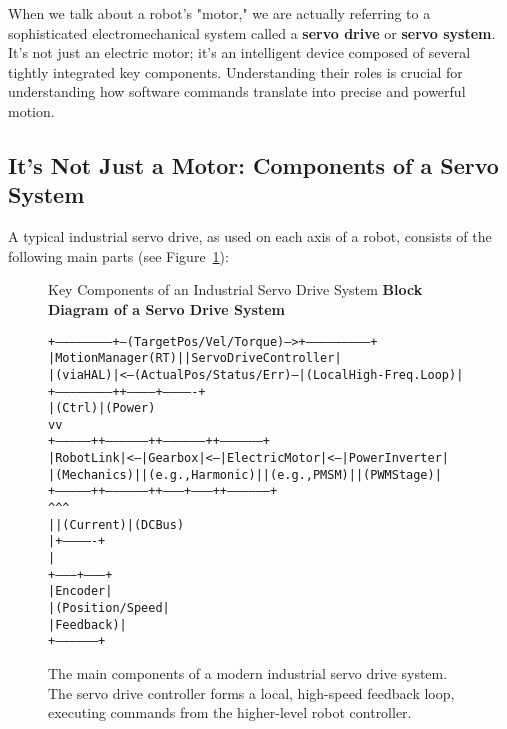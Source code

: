 When we talk about a robot's "motor," we are actually referring to a sophisticated electromechanical system called a \textbf{servo drive} or \textbf{servo system}. It's not just an electric motor; it's an intelligent device composed of several tightly integrated key components. Understanding their roles is crucial for understanding how software commands translate into precise and powerful motion.

\subsection{It's Not Just a Motor: Components of a Servo System}
\label{subsec:servo_components}

A typical industrial servo drive, as used on each axis of a robot, consists of the following main parts (see Figure~\ref{fig:servo_drive_diagram}):

\begin{figure}[h!]
    \centering
    \begin{infobox}{Key Components of an Industrial Servo Drive System}
        \textbf{Block Diagram of a Servo Drive System}

        {\footnotesize
        \begin{alltt}
+-----------------------+ --(Target Pos/Vel/Torque)--> +--------------------------+
| MotionManager (RT)    |                              | Servo Drive Controller   |
| (via HAL)             | <--(Actual Pos/Status/Err)-- | (Local High-Freq. Loop)  |
+-----------------------+                              +------------+-------------+
                                                                    | (Ctrl) | (Power)
                                                                    v        v
+--------------+   +------------------+   +------------------+   +------------------+
| Robot Link   |<--| Gearbox          |<--| Electric Motor   |<--| Power Inverter   |
| (Mechanics)  |   | (e.g., Harmonic) |   | (e.g., PMSM)     |   | (PWM Stage)      |
+--------------+   +------------------+   +--------+---------+   +------------------+
                                                   ^       ^             ^
                                                   |       | (Current)   | (DC Bus)
                                                   |       +-------------+
                                                   |
                                         +---------+--------+
                                         | Encoder          |
                                         | (Position/Speed  |
                                         |  Feedback)       |
                                         +------------------+
        \end{alltt}
        }
    \end{infobox}
            \vspace{0.3cm}
    \caption{The main components of a modern industrial servo drive system. The servo drive controller forms a local, high-speed feedback loop, executing commands from the higher-level robot controller.}
    \label{fig:servo_drive_diagram}
\end{figure}


